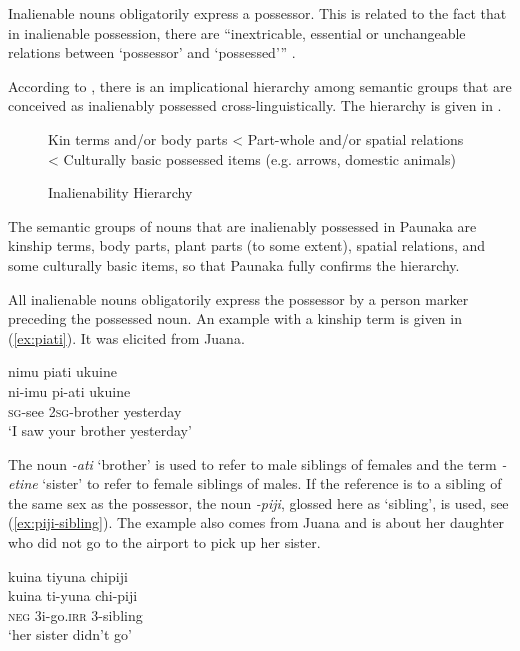 Inalienable nouns obligatorily express a possessor. This is related to the fact that in inalienable possession, there are “inextricable, essential or unchangeable relations between ‘possessor’ and ‘possessed’” \citep[4]{ChappelMcGregor1996}. 

According to \citet[572]{Nichols1988}, there is an implicational hierarchy among semantic groups that are conceived as inalienably possessed cross-linguistically. The hierarchy is given in .

\begin{figure}[!ht]
\centering
Kin terms and/or body parts < Part-whole and/or spatial relations < Culturally basic possessed items (e.g. arrows, domestic animals)
\caption{Inalienability Hierarchy \citep[572]{Nichols1988}}
\label{fig:InalienabilityHierarchy}
\end{figure}

The semantic groups of nouns that are inalienably possessed in Paunaka are kinship terms, body parts, plant parts (to some extent), spatial relations, and some culturally basic items, so that Paunaka fully confirms the hierarchy.

All inalienable nouns obligatorily express the possessor by a person marker preceding the possessed noun. An example with a kinship term is given in (\ref{ex:piati}). It was elicited from Juana.

\ea\label{ex:piati}
\begingl 
\glpreamble nimu piati ukuine\\
\gla ni-imu pi-ati ukuine\\ 
\textsc{sg}-see 2\textsc{sg}-brother yesterday\\ 
\glft ‘I saw your brother yesterday’\\ 
\endgl
\trailingcitation{[jxx-e110923l-1.049]}
\xe
{}

The noun \textit{-ati} ‘brother’ is used to refer to male siblings of females and the term \textit{-etine} ‘sister’ to refer to female siblings of males. If the reference is to a sibling of the same sex as the possessor, the noun \textit{-piji}, glossed here as ‘sibling’, is used, see (\ref{ex:piji-sibling}). The example also comes from Juana and is about her daughter who did not go to the airport to pick up her sister.

\ea\label{ex:piji-sibling}
\begingl 
\glpreamble kuina tiyuna chipiji\\
\gla kuina ti-yuna chi-piji\\ 
\glb \textsc{neg} 3i-go.\textsc{irr} 3-sibling\\ 
\glft ‘her sister didn’t go’\\ 
\endgl
\trailingcitation{[jxx-p110923l-1.299]}
\xe

